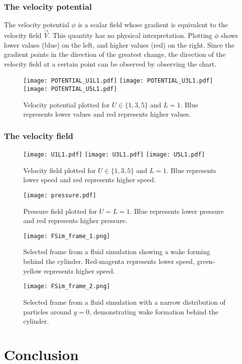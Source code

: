 \subsubsection{The velocity potential}
The velocity potential $\phi$ is a scalar field whose gradient is equivalent to the velocity field $\vec{V}$. This quantity has no
physical interpretation. Plotting $\phi$ shows lower values (blue) on the left, and higher values (red) on the right. Since the gradient 
points in the direction of the greatest change, the direction of the velocity field at a certain point can be observed by observing the chart. 
\begin{figure}
	\centering
	\texttt{[image: POTENTIAL\_U1L1.pdf]}
	\texttt{[image: POTENTIAL\_U3L1.pdf]}
	\texttt{[image: POTENTIAL\_U5L1.pdf]}
	\caption{Velocity potential plotted for $U\in\{1,3,5\}$ and $L=1$. Blue represents lower values and red represents higher values.}
	\label{figure:VELOCITY-POTENTIAL}
\end{figure}

\subsubsection{The velocity field}
\begin{figure}
	\centering
	\texttt{[image: U1L1.pdf]}
	\texttt{[image: U3L1.pdf]}
	\texttt{[image: U5L1.pdf]}
	\caption{Velocity field plotted for $U\in\{1,3,5\}$ and $L=1$. Blue represents lower speed and red represents higher speed.}
\end{figure}
\begin{figure}
	\centering
	\texttt{[image: pressure.pdf]}
	\caption{Pressure field plotted for $U=L=1$. Blue represents lower pressure and red represents higher pressure.}
\end{figure}
\begin{figure}
	\centering
	\texttt{[image: FSim\_frame\_1.png]}
	\caption{Selected frame from a fluid simulation showing a wake forming behind the cylinder. Red-magenta represents lower speed, green-yellow represents higher speed.}
\end{figure}
\begin{figure}
	\centering
	\texttt{[image: FSim\_frame\_2.png]}
	\caption{Selected frame from a fluid simulation with a narrow distribution of particles around $y=0$, demonstrating wake formation behind the cylinder.}
\end{figure}

\section{Conclusion}